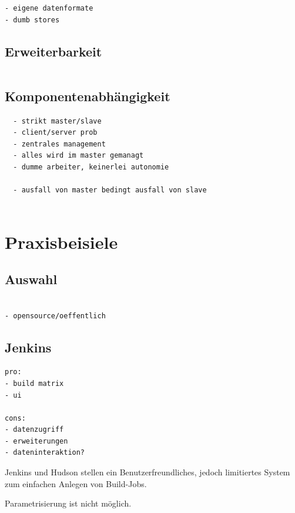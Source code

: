 \begin{verbatim}
- eigene datenformate
- dumb stores
\end{verbatim}

\subsection{Erweiterbarkeit}
\begin{verbatim}

\end{verbatim}


\subsection{Komponentenabh\"angigkeit}
\begin{verbatim}
  - strikt master/slave
  - client/server prob
  - zentrales management
  - alles wird im master gemanagt
  - dumme arbeiter, keinerlei autonomie

  - ausfall von master bedingt ausfall von slave


\end{verbatim}

\section{Praxisbeisiele}

\subsection{Auswahl}

\begin{verbatim}

- opensource/oeffentlich
\end{verbatim}

\subsection{Jenkins}

\begin{verbatim}
pro:
- build matrix
- ui

cons:
- datenzugriff
- erweiterungen
- dateninteraktion?

\end{verbatim}

Jenkins und Hudson stellen ein Benutzerfreundliches,
jedoch limitiertes System zum einfachen Anlegen von Build-Jobs.

Parametrisierung ist nicht möglich.

